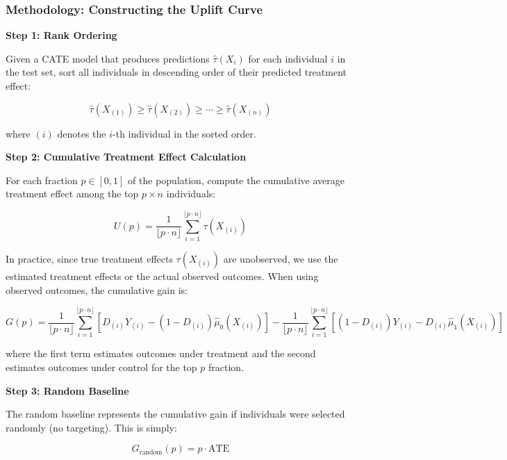 \documentclass[12pt,a4paper]{article}
\begin{document}
\subsubsection{Methodology: Constructing the Uplift Curve}

\textbf{Step 1: Rank Ordering}

Given a CATE model that produces predictions $\hat{\tau}(X_i)$ for each individual $i$ in the test set, sort all individuals in descending order of their predicted treatment effect:

\begin{equation}
\hat{\tau}(X_{(1)}) \geq \hat{\tau}(X_{(2)}) \geq \cdots \geq \hat{\tau}(X_{(n)})
\end{equation}

where $(i)$ denotes the $i$-th individual in the sorted order.

\textbf{Step 2: Cumulative Treatment Effect Calculation}

For each fraction $p \in [0,1]$ of the population, compute the cumulative average treatment effect among the top $p \times n$ individuals:

\begin{equation}
U(p) = \frac{1}{\lfloor p \cdot n \rfloor} \sum_{i=1}^{\lfloor p \cdot n \rfloor} \tau(X_{(i)})
\end{equation}

In practice, since true treatment effects $\tau(X_{(i)})$ are unobserved, we use the estimated treatment effects or the actual observed outcomes. When using observed outcomes, the cumulative gain is:

\begin{equation}
G(p) = \frac{1}{\lfloor p \cdot n \rfloor} \sum_{i=1}^{\lfloor p \cdot n \rfloor} \left[ D_{(i)} Y_{(i)} - (1-D_{(i)}) \hat{\mu}_0(X_{(i)}) \right] - \frac{1}{\lfloor p \cdot n \rfloor} \sum_{i=1}^{\lfloor p \cdot n \rfloor} \left[ (1-D_{(i)}) Y_{(i)} - D_{(i)} \hat{\mu}_1(X_{(i)}) \right]
\end{equation}

where the first term estimates outcomes under treatment and the second estimates outcomes under control for the top $p$ fraction.

\textbf{Step 3: Random Baseline}

The random baseline represents the cumulative gain if individuals were selected randomly (no targeting). This is simply:

\begin{equation}
G_{\text{random}}(p) = p \cdot \text{ATE}
\end{equation}
\end{document}
